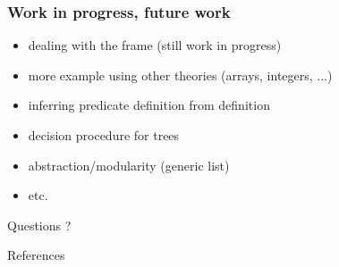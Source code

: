 \documentclass{beamer}
\begin{document}
\begin{frame}
  \frametitle{Work in progress, future work}

  \begin{itemize}
  \item dealing with the frame (still work in progress)
  \item more example using other theories (arrays, integers, ...)
  \item inferring \LRJQ predicate definition from \JoshLogic definition
  \item decision procedure for trees
  \item abstraction/modularity (generic list)
  \item etc.
  \end{itemize}

\end{frame}

\begin{frame}

  \begin{center}
  \huge
  Questions ?
  \end{center}
\end{frame}

\begin{frame}[allowframebreaks]{References}
  {\tiny
  
  
  }
\end{frame}
\end{document}
